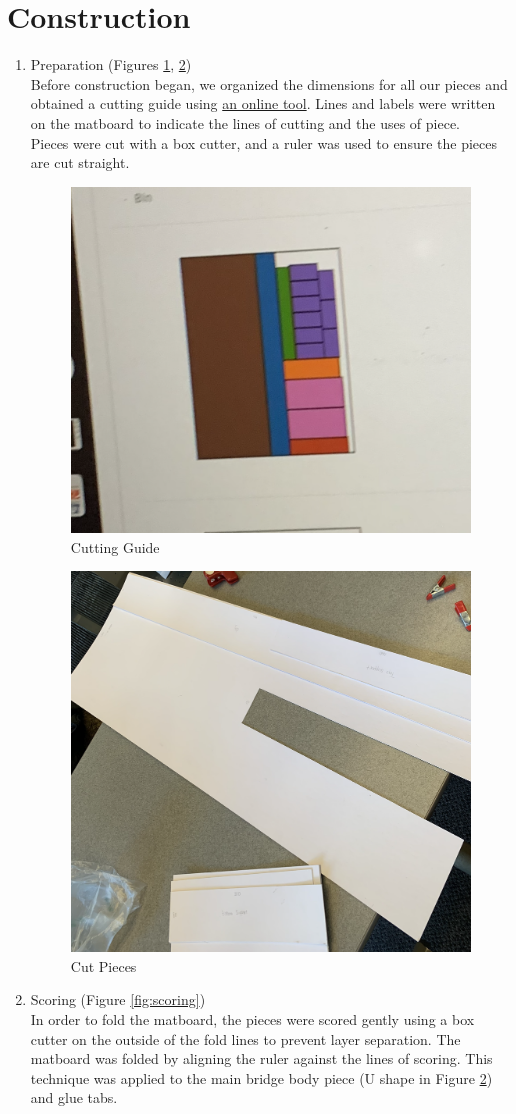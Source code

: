 \documentclass[11pt,twocolumn,letterpaper]{article}
\begin{document}
\section*{Construction}
\begin{enumerate}
    \item Preparation (Figures \ref{fig:cutting_guide}, \ref{fig:cut_pieces})\\
    Before construction began, we organized the dimensions for all our pieces and obtained a cutting guide using \href{https://planetcalc.com/8634/}{an online tool}. Lines and labels were written on the matboard to indicate the lines of cutting and the uses of piece.\\ 
    Pieces were cut with a box cutter, and a ruler was used to ensure the pieces are cut straight.
    \begin{figure}[hbt!]
    \centering
        \includegraphics[width=.38\textwidth]{figures/prep1.png}
        \caption {Cutting Guide}
        \label{fig:cutting_guide}
    \hfill
    \end{figure}
    \begin{figure}[h!]
    \centering
        \includegraphics[width=.38\textwidth]{figures/prep2.png}
        \caption {Cut Pieces}
        \label{fig:cut_pieces}
    \hfill
    \end{figure}
    \item Scoring (Figure \ref{fig:scoring})\\
    In order to fold the matboard, the pieces were scored gently using a box cutter on the outside of the fold lines to prevent layer separation. The matboard was folded by aligning the ruler against the lines of scoring. This technique was applied to the main bridge body piece (U shape in Figure \ref{fig:cut_pieces}) and glue tabs.  

\end{enumerate}
\end{document}
